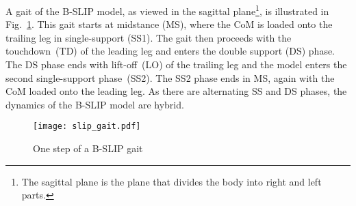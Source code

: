 A gait of the B-SLIP model, as viewed in the sagittal plane\footnote{The sagittal plane is the plane that divides the body into right and left parts.}, is illustrated in Fig.~\ref{fig:slip_gait}. This gait starts at midstance (MS), where the CoM is loaded onto the trailing leg in single-support (SS1). The gait then proceeds with the touchdown~(TD) of the leading leg and enters the double support (DS) phase. The DS phase ends with lift-off~(LO) of the trailing leg and the model enters the second single-support phase~(SS2). The SS2 phase ends in MS, again with the CoM loaded onto the leading leg. As there are alternating SS and DS phases, the dynamics of the B-SLIP model are hybrid.

\begin{figure}
	\centering
	\texttt{[image: slip\_gait.pdf]}
	\caption{One step of a B-SLIP gait}\label{fig:slip_gait}
\end{figure} 

